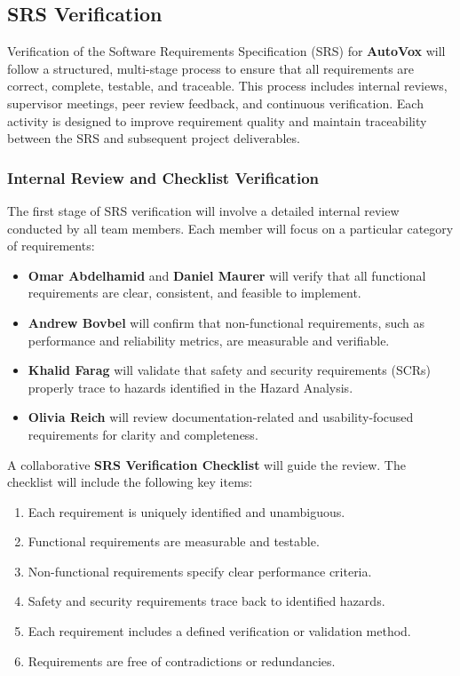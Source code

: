 \documentclass[12pt, titlepage]{article}
\begin{document}
\subsection{SRS Verification}

Verification of the Software Requirements Specification (SRS) for \textbf{AutoVox} will follow a structured, multi-stage process to ensure that all requirements are correct, complete, testable, and traceable. This process includes internal reviews, supervisor meetings, peer review feedback, and continuous verification. Each activity is designed to improve requirement quality and maintain traceability between the SRS and subsequent project deliverables.

\subsubsection{Internal Review and Checklist Verification}

The first stage of SRS verification will involve a detailed internal review conducted by all team members. Each member will focus on a particular category of requirements:

\begin{itemize}
  \item \textbf{Omar Abdelhamid} and \textbf{Daniel Maurer} will verify that all functional requirements are clear, consistent, and feasible to implement.
  \item \textbf{Andrew Bovbel} will confirm that non-functional requirements, such as performance and reliability metrics, are measurable and verifiable.
  \item \textbf{Khalid Farag} will validate that safety and security requirements (SCRs) properly trace to hazards identified in the Hazard Analysis.
  \item \textbf{Olivia Reich} will review documentation-related and usability-focused requirements for clarity and completeness.
\end{itemize}

A collaborative \textbf{SRS Verification Checklist} will guide the review. The checklist will include the following key items:

\begin{enumerate}
  \item Each requirement is uniquely identified and unambiguous.
  \item Functional requirements are measurable and testable.
  \item Non-functional requirements specify clear performance criteria.
  \item Safety and security requirements trace back to identified hazards.
  \item Each requirement includes a defined verification or validation method.
  \item Requirements are free of contradictions or redundancies.
\end{enumerate}
\end{document}
